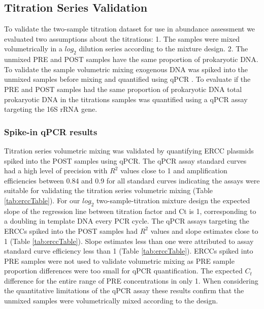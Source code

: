 \documentclass{bmcart}
\begin{document}
\subsection*{Titration Series Validation}

To validate the two-sample titration dataset for use in abundance
assessment we evaluated two assumptions about the titrations: 1. The
samples were mixed volumetrically in a \(log_2\) dilution series
according to the mixture design. 2. The unmixed PRE and POST samples
have the same proportion of prokaryotic DNA. To validate the sample
volumetric mixing exogenous DNA was spiked into the unmixed samples
before mixing and quantified using qPCR . To evaluate if the PRE and
POST samples had the same proportion of prokaryotic DNA total
prokaryotic DNA in the titrations samples was quantified using a qPCR
assay targeting the 16S rRNA gene.

\subsubsection*{Spike-in qPCR results}

Titration series volumetric mixing was validated by quantifying ERCC
plasmids spiked into the POST samples using qPCR. The qPCR assay
standard curves had a high level of precision with \(R^2\) values close
to 1 and amplification efficiencies between 0.84 and 0.9 for all
standard curves indicating the assays were suitable for validating the
titration series volumetric mixing (Table \ref{tab:erccTable}). For our
\(log_2\) two-sample-titration mixture design the expected slope of the
regression line between titration factor and Ct is 1, corresponding to a
doubling in template DNA every PCR cycle. The qPCR assays targeting the
ERCCs spiked into the POST samples had \(R^2\) values and slope
estimates close to 1 (Table \ref{tab:erccTable}). Slope estimates less
than one were attributed to assay standard curve efficiency less than 1
(Table \ref{tab:erccTable}). ERCCs spiked into PRE samples were not used
to validate volumetric mixing as PRE sample proportion differences were
too small for qPCR quantification. The expected \(C_t\) difference for
the entire range of PRE concentrations in only 1. When considering the
quantitative limitations of the qPCR assay these results confirm that
the unmixed samples were volumetrically mixed according to the design.
\end{document}
